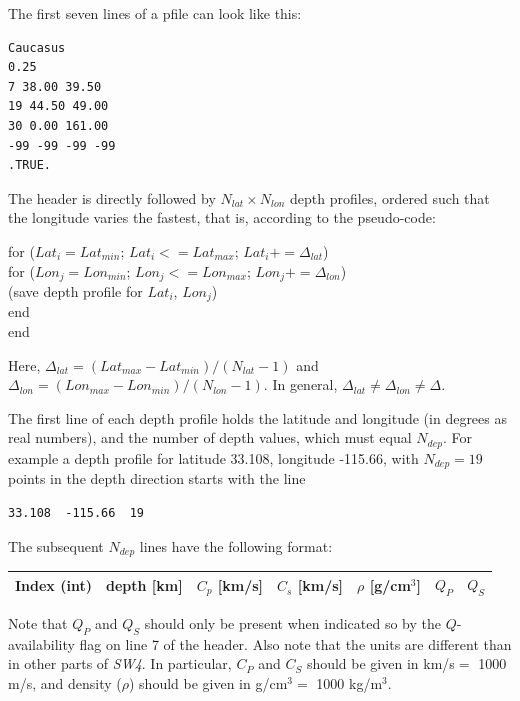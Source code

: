 \documentclass[11pt]{report}
\begin{document}
The first seven lines of a pfile can look like this:
\begin{verbatim}
Caucasus
0.25
7 38.00 39.50
19 44.50 49.00
30 0.00 161.00
-99 -99 -99 -99
.TRUE.
\end{verbatim}

The header is directly followed by $N_{lat}\times N_{lon}$ depth profiles, ordered such that the longitude
varies the fastest, that is, according to the pseudo-code:
\begin{flushleft}
\hspace{10mm}  for ($Lat_i= Lat_{min}$; $Lat_i <= Lat_{max}$; $Lat_i += \Delta_{lat}$)\\
\hspace{20mm}    for ($Lon_j= Lon_{min}$; $Lon_j <= Lon_{max}$; $Lon_j += \Delta_{lon}$)\\
\hspace{30mm}      (save depth profile for $Lat_i$, $Lon_j$)\\
\hspace{20mm}    end\\
\hspace{10mm}  end
\end{flushleft}
Here, $\Delta_{lat} = (Lat_{max} - Lat_{min})/(N_{lat}-1)$ and  $\Delta_{lon} = (Lon_{max} -
Lon_{min})/(N_{lon}-1)$. In general, $\Delta_{lat}\ne \Delta_{lon}\ne\Delta$.

The first line of each depth profile holds the latitude and longitude (in degrees as real
numbers), and the number of depth values, which must equal $N_{dep}$. For example a depth profile
for latitude 33.108, longitude -115.66, with $N_{dep}=19$ points in the depth direction starts with the line
\begin{verbatim}
33.108  -115.66  19
\end{verbatim}
The subsequent $N_{dep}$ lines have the following format:
\begin{center}
\begin{tabular}{lllllll}\hline
Index (int)& depth [km] & $C_p$ [km/s] &  $C_s$ [km/s] & $\rho$ [g/cm$^3$] & $Q_P$ & $Q_S$ \\ \hline
\end{tabular}
\end{center}
Note that $Q_P$ and $Q_S$ should only be present when indicated so by the $Q$-availability flag on
line 7 of the header. Also note that the units are different than in other parts of \emph{SW4}. In
particular, $C_P$ and $C_S$ should be given in km/s$=$ 1000 m/s, and density ($\rho$) should be
given in g/cm$^3=$ 1000 kg/m$^3$.
\end{document}
